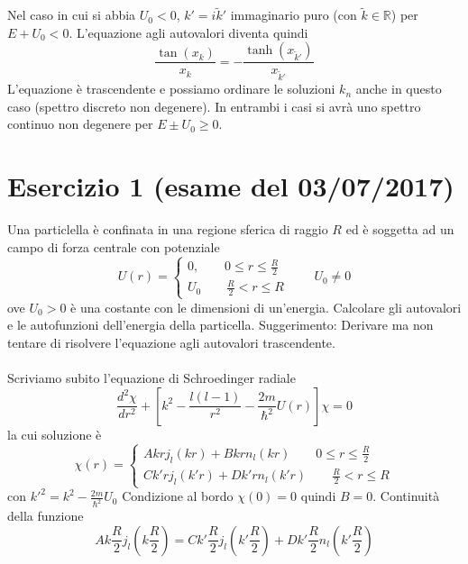 \documentclass[a4paper]{article}
\begin{document}
        Nel caso in cui si abbia $U_0<0$, $k'=i\tilde{k}'$ immaginario puro (con $\tilde{k}\in\mathbb{R}$) per $E+U_0<0$.
        L'equazione agli autovalori diventa quindi
        \begin{equation*}
            \frac{\tan(x_k)}{x_k}=-\frac{\tanh(x_{\tilde{k}'})}{x_{\tilde{k}'}}
        \end{equation*}
        L'equazione è trascendente e possiamo ordinare le soluzioni $k_n$ anche in questo caso (spettro discreto non degenere).
        In entrambi i casi si avrà uno spettro continuo non degenere per $E\pm U_0\geq 0$.

    \section*{Esercizio 1 (esame del 03/07/2017)}
    Una particlella è confinata in una regione sferica di raggio $R$ ed è soggetta ad un campo di forza centrale con potenziale
    \begin{equation*}
        U(r)=
        \begin{cases}
            0,\quad\quad 0\leq r\leq\frac{R}{2}\\
            U_0\quad\quad \frac{R}{2}<r\leq R
        \end{cases}
        \quad\quad U_0\neq 0
    \end{equation*}
    ove $U_0 > 0$ è una costante con le dimensioni di un'energia. Calcolare gli autovalori e le autofunzioni dell'energia della particella.
    Suggerimento: Derivare ma non tentare di risolvere l'equazione agli autovalori trascendente.
    \\
    \\
    Scriviamo subito l'equazione di Schroedinger radiale
    \begin{equation*}
        \frac{d^2\chi}{dr^2}+\left[k^2-\frac{l(l-1)}{r^2}-\frac{2m}{\hbar^2}U(r)\right]\chi=0
    \end{equation*}
    la cui soluzione è
    \begin{equation*}
        \chi(r)=
        \begin{cases}
            Akrj_l(kr)+Bkrn_l(kr)\quad\quad 0\leq r\leq\frac{R}{2}\\
            Ck'rj_l(k'r)+Dk'rn_l(k'r)\quad\quad \frac{R}{2}<r\leq R
        \end{cases}
    \end{equation*}
    con $k'^2=k^2-\frac{2m}{\hbar^2}U_0$
    Condizione al bordo $\chi(0)=0$ quindi $B=0$.
    Continuità della funzione
    \begin{equation*}
        Ak\frac{R}{2}j_l(k\frac{R}{2})=Ck'\frac{R}{2}j_l(k'\frac{R}{2})+Dk'\frac{R}{2}n_l(k'\frac{R}{2})
    \end{equation*}
\end{document}
